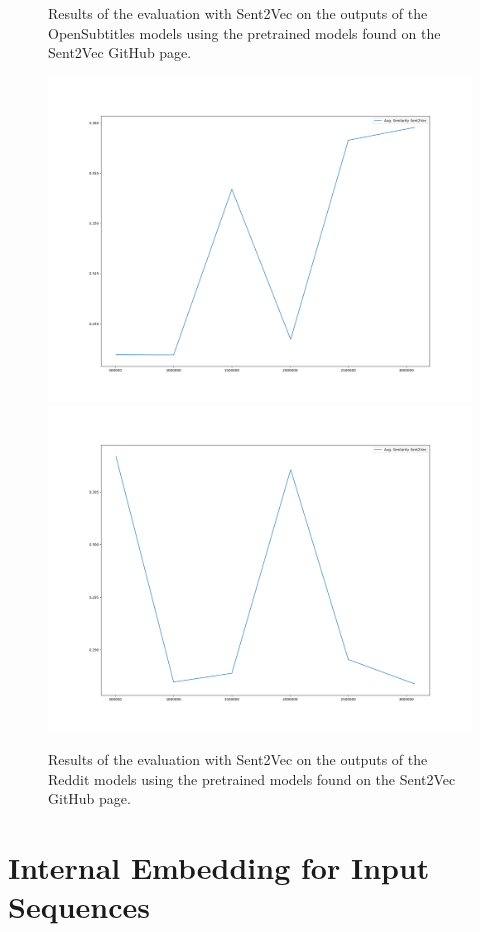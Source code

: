 \begin{figure}[H]
	\centering
	\small
	\endminipage\hfill
	\caption{Results of the evaluation with Sent2Vec on the outputs of the OpenSubtitles models using the pretrained models found on the Sent2Vec GitHub page.}
	\label{results:sent2vec:opensubtitles:results}
\end{figure}

\begin{figure}[H]
	\includegraphics[width=\linewidth]{img/plots/reddit/s2v_wiki_cosine_similarity.png}
	\centering
	\small
	\endminipage\hfill
	\includegraphics[width=\linewidth]{img/plots/reddit/s2v_twitter_cosine_similarity.png}
	\centering
	\small
	\endminipage\hfill
	\caption{Results of the evaluation with Sent2Vec on the outputs of the Reddit models using the pretrained models found on the Sent2Vec GitHub page.}
	\label{results:sent2vec:reddit:results}
\end{figure}

\section{Internal Embedding for Input Sequences}
\blindtext